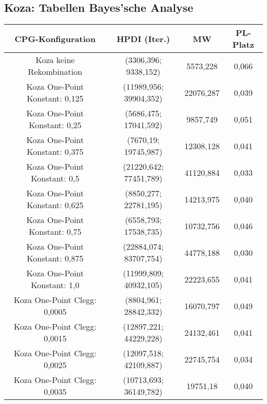 \subsection{Koza: Tabellen Bayes'sche Analyse}
\label{subsec:appendixTabellenBayesKoza}
 \begin{table}[H]
	\centering
	\begin{tabular}{c | c | c | c}
		\textbf{CPG-Konfiguration} & \textbf{HPDI (Iter.)} & \textbf{MW} & \textbf{PL-Platz}\\
		\hline
		Koza keine Rekombination & (\color{Green}3306,396\color{black}; \color{Green}9338,152\color{black}) & \color{Green}5573,228\color{black} & \color{Green}0,066\color{black}\\
		\hline
		\hline
		Koza One-Point Konstant: 0,125 & (11989,956; 39904,352) & 22076,287 & 0,039\\
		\hline
		Koza One-Point Konstant: 0,25 & (\color{Green}5686,475\color{black}; \color{Green}17041,592\color{black}) & \color{Green}9857,749\color{black} & \color{Green}0,051\color{black}\\
		\hline
		Koza One-Point Konstant: 0,375 & (7670,19; 19745,987) & 12308,128 & 0,041\\
		\hline
		Koza One-Point Konstant: 0,5 & (\color{red}21220,642\color{black}; \color{red}77451,789\color{black}) & \color{red}41120,884\color{black} & \color{red}0,033\color{black}\\
		\hline
		Koza One-Point Konstant: 0,625 & (8850,277; 22781,195) & 14213,975 & 0,040\\
		\hline
		Koza One-Point Konstant: 0,75 & (6558,793; 17538,735) & 10732,756 & 0,046\\
		\hline
		Koza One-Point Konstant: 0,875 & (\color{red}22884,074\color{black}; \color{red}83707,754\color{black}) & \color{red}44778,188\color{black} & \color{red}0,030\color{black}\\
		\hline
		Koza One-Point Konstant: 1,0 & (11999,809; 40932,105) & 22223,655 & 0,041\\
		\hline
		\hline
		Koza One-Point Clegg: 0,0005 & (8804,961; 28842,332) & 16070,797 & 0,049\\
		\hline
		Koza One-Point Clegg: 0,0015 & (\color{red}12897,221\color{black}; \color{red}44229,228\color{black}) & \color{red}24132,461\color{black} & 0,041\\
		\hline
		Koza One-Point Clegg: 0,0025 & (12097,518; 42109,887) & 22745,754 & \color{red}0,034\color{black}\\
		\hline
		Koza One-Point Clegg: 0,0035 & (10713,693; 36149,782) & 19751,18 & 0,040\\

\end{tabular}
\end{table}
